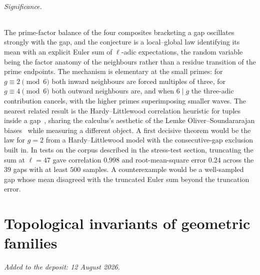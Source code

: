 \documentclass[11pt]{article}
\theoremstyle{definition}
\begin{document}
\paragraph{Significance.}
The prime-factor balance of the four composites bracketing a gap oscillates strongly with the gap, and the conjecture is a local--global law identifying its mean with an explicit Euler sum of $\ell$-adic expectations, the random variable being the factor anatomy of the neighbours rather than a residue transition of the prime endpoints.  The mechanism is elementary at the small primes: for $g\equiv2\pmod6$ both inward neighbours are forced multiples of three, for $g\equiv4\pmod6$ both outward neighbours are, and when $6\mid g$ the three-adic contribution cancels, with the higher primes superimposing smaller waves.  The nearest related result is the Hardy--Littlewood correlation heuristic for tuples inside a gap~\cite{HL1923}, sharing the calculus's aesthetic of the Lemke Oliver--Soundararajan biases~\cite{LOS} while measuring a different object.  A first decisive theorem would be the law for $g=2$ from a Hardy--Littlewood model with the consecutive-gap exclusion built in.  In tests on the corpus described in the stress-test section, truncating the sum at $\ell=47$ gave correlation $0.998$ and root-mean-square error $0.24$ across the $39$ gaps with at least $500$ samples.  A counterexample would be a well-sampled gap whose mean disagreed with the truncated Euler sum beyond the truncation error.

\part{Topological invariants of geometric families}

\medskip\noindent\emph{Added to the deposit: 12 August 2026.}\par\medskip
\end{document}

